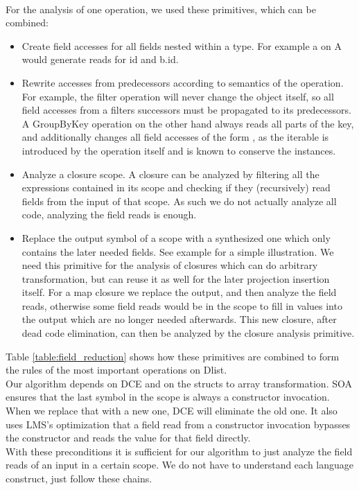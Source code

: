 \\
For the analysis of one operation, we used these primitives, which can be combined:
\begin{itemize}
\item Create field accesses for all fields nested within a type. For example a  on A would generate reads for id and b.id. 
\item Rewrite accesses from predecessors according to semantics of the operation. For example, the filter operation will never change the object itself, so all field accesses from a filters successors must be propagated to its predecessors. A GroupByKey operation on the other hand always reads all parts of the key, and additionally changes all field accesses of the form , as the iterable is introduced by the operation itself and is known to conserve the instances.
\item Analyze a closure scope. A closure can be analyzed by filtering all the expressions contained in its scope and checking if they (recursively) read fields from the input of that scope. As such we do not actually analyze all code, analyzing the field reads is enough. 
\item Replace the output symbol of a scope with a synthesized one which only contains the later needed fields. See example  for a simple illustration. We need this primitive for the analysis of closures which can do arbitrary transformation, but can reuse it as well for the later projection insertion itself. For a map closure we replace the output, and then analyze the field reads, otherwise some field reads would be in the scope to fill in values into the output which are no longer needed afterwards. This new closure, after dead code elimination, can then be analyzed by the closure analysis primitive.
\end{itemize}
Table \ref{table:field_reduction} shows how these primitives are combined to form the rules of the most important operations on Dlist.\\

Our algorithm depends on DCE and on the structs to array transformation. SOA ensures that the last symbol in the scope is always a constructor invocation. When we replace that with a new one, DCE will eliminate the old one. It also uses LMS's optimization that a field read from a constructor invocation bypasses the constructor and reads the value for that field directly.\\
With these preconditions it is sufficient for our algorithm to just analyze the field reads of an input in a certain scope. We do not have to understand each language construct, just follow these chains.


